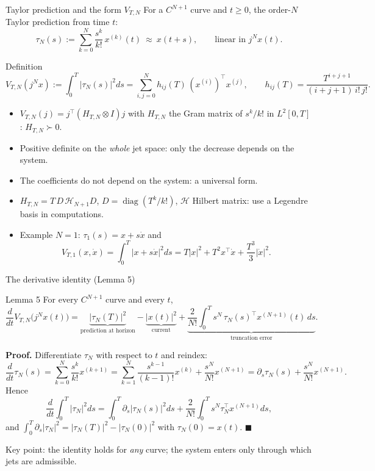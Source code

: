 \documentclass[10pt,aspectratio=169]{beamer}
\newcommand{\tr}{^{\top}}
\DeclareMathOperator{\diag}{diag}
\begin{document}
\begin{frame}{Taylor prediction and the form $V_{T,N}$}
For a $C^{N+1}$ curve and $t\ge0$, the order-$N$ Taylor prediction from time $t$:
\[
\tau_N(s):=\sum_{k=0}^N\frac{s^k}{k!}\,x^{(k)}(t)\ \approx\ x(t+s),\qquad\text{linear in }j^Nx(t).
\]
\begin{block}{Definition}
\[
V_{T,N}(j^Nx):=\int_0^T|\tau_N(s)|^2ds=\sum_{i,j=0}^Nh_{ij}(T)\,(x^{(i)})\tr x^{(j)},\qquad h_{ij}(T)=\frac{T^{i+j+1}}{(i+j+1)\,i!\,j!}.
\]
\end{block}
\begin{itemize}
\item $V_{T,N}(j)=j\tr(H_{T,N}\otimes I)j$ with $H_{T,N}$ the \alert{Gram matrix} of $s^k/k!$ in $L^2[0,T]$: $H_{T,N}\succ0$.
\item Positive definite on the \emph{whole} jet space: only the decrease depends on the system.
\item The coefficients do not depend on the system: a \alert{universal} form.
\item $H_{T,N}=T\,D\,\mathcal H_{N+1}D$, $D=\diag(T^k/k!)$, $\mathcal H$ Hilbert matrix: use a Legendre basis in computations.
\item \alert{Example $N=1$}: $\tau_1(s)=x+s\dot x$ and
\[
V_{T,1}(x,\dot x)=\int_0^T|x+s\dot x|^2ds=T|x|^2+T^2x\tr\dot x+\frac{T^3}{3}|\dot x|^2 .
\]
\end{itemize}
\end{frame}

\begin{frame}{The derivative identity (Lemma 5)}
\begin{block}{Lemma 5}
For every $C^{N+1}$ curve and every $t$,
\[
\frac{d}{dt}V_{T,N}\big(j^Nx(t)\big)=\underbrace{|\tau_N(T)|^2}_{\text{prediction at horizon}}-\underbrace{|x(t)|^2}_{\text{current}}+\underbrace{\frac{2}{N!}\int_0^Ts^N\,\tau_N(s)\tr x^{(N+1)}(t)\,ds}_{\text{truncation error}} .
\]
\end{block}
\textbf{Proof.} Differentiate $\tau_N$ with respect to $t$ and reindex:
\[
\frac{d}{dt}\tau_N(s)=\sum_{k=0}^N\frac{s^k}{k!}x^{(k+1)}=\sum_{k=1}^{N}\frac{s^{k-1}}{(k-1)!}x^{(k)}+\frac{s^N}{N!}x^{(N+1)}=\partial_s\tau_N(s)+\frac{s^N}{N!}x^{(N+1)}.
\]
Hence
\[
\frac{d}{dt}\int_0^T|\tau_N|^2ds=\int_0^T\partial_s|\tau_N(s)|^2ds+\frac{2}{N!}\int_0^Ts^N\tau_N\tr x^{(N+1)}ds,
\]
and $\int_0^T\partial_s|\tau_N|^2=|\tau_N(T)|^2-|\tau_N(0)|^2$ with $\tau_N(0)=x(t)$. $\blacksquare$
\medskip

\alert{Key point}: the identity holds for \emph{any} curve; the system enters only through which jets are admissible.
\end{frame}
\end{document}
